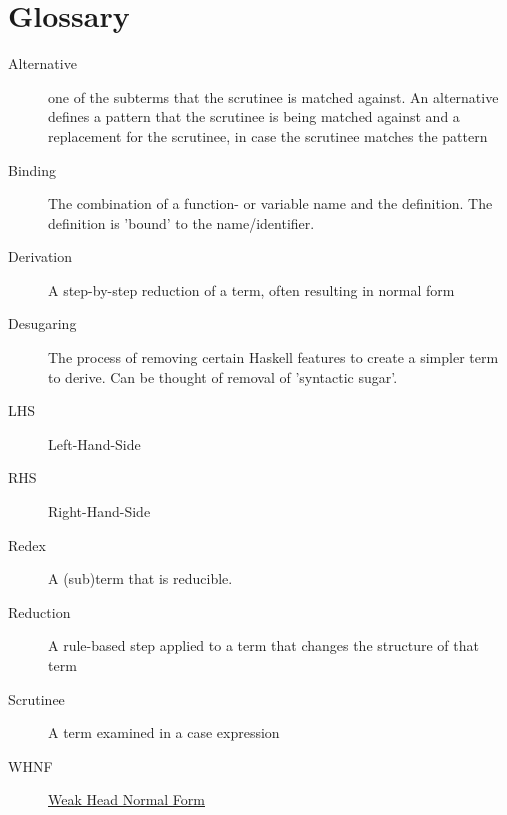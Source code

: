 \newpage

\section*{Glossary}

\begin{description}
    \item[Alternative] one of the subterms that the scrutinee is matched against.
        An alternative defines a pattern that the scrutinee is being matched against
        and a replacement for the scrutinee, in case the scrutinee matches the pattern
    \item[Binding] The combination of a function- or variable name and the definition.
        The definition is 'bound' to the name/identifier.
    \item[Derivation] A step-by-step reduction of a term, often resulting in normal form
    \item[Desugaring] The process of removing certain Haskell features to create a simpler term to derive.
        Can be thought of removal of 'syntactic sugar'.
    \item[LHS] Left-Hand-Side 
    \item[RHS] Right-Hand-Side
    \item[Redex] A (sub)term that is reducible.
    \item[Reduction] A rule-based step applied to a term that changes the structure of that term
    \item[Scrutinee] A term examined in a case expression
    \item[WHNF] \href{https://wiki.haskell.org/Weak_head_normal_form#:~:text=An%20expression%20is%20in%20weak,abstraction%20%5Cx%20%2D%3E%20expression%20.}{Weak Head Normal Form}
\end{description}